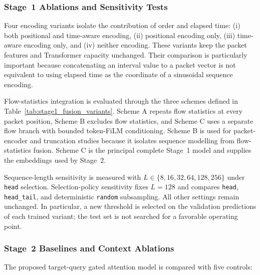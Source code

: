 \documentclass[11pt,fleqn]{report}
\begin{document}
\subsubsection{Stage~1 Ablations and Sensitivity Tests}
\label{subsubsec:stage1_ablation_protocol}

Four encoding variants isolate the contribution of order and elapsed time:
(i) both positional and time-aware encoding, (ii) positional encoding only,
(iii) time-aware encoding only, and (iv) neither encoding. These variants keep
the packet features and Transformer capacity unchanged. Their comparison is
particularly important because concatenating an interval value to a packet
vector is not equivalent to using elapsed time as the coordinate of a
sinusoidal sequence encoding.

Flow-statistics integration is evaluated through the three schemes defined in
Table~\ref{tab:stage1_fusion_variants}. Scheme A repeats flow statistics at
every packet position, Scheme B excludes flow statistics, and Scheme C uses a
separate flow branch with bounded token-FiLM conditioning. Scheme B is used
for packet-encoder and truncation studies because it isolates sequence
modelling from flow-statistics fusion. Scheme C is the principal complete
Stage~1 model and supplies the embeddings used by Stage~2.

Sequence-length sensitivity is measured with
$L\in\{8,16,32,64,128,256\}$ under \texttt{head} selection. Selection-policy
sensitivity fixes $L=128$ and compares \texttt{head},
\texttt{head\_tail}, and deterministic \texttt{random} subsampling. All other
settings remain unchanged. In particular, a new threshold is selected on the
validation predictions of each trained variant; the test set is not searched
for a favorable operating point.

\subsubsection{Stage~2 Baselines and Context Ablations}
\label{subsubsec:stage2_baseline_protocol}

The proposed target-query gated attention model is compared with five controls:
\end{document}
